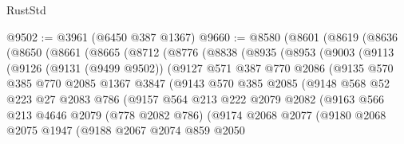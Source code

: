 \begin{lexlean}{RustStd}
\begin{coremodule}
@9502 := @3961 (@6450 @387 @1367)
@9660 := @8580
    (@8601
      (@8619
        (@8636
          (@8650
            (@8661
              (@8665
                (@8712
                  (@8776
                    (@8838
                      (@8935
                        (@8953
                          (@9003
                            (@9113
                              (@9126
                                (@9131 (@9499 @9502))
                                (@9127
                                  @571
                                  @387
                                  @770
                                  @2086
                                  (@9135
                                    @570
                                    @385
                                    @770
                                    @2085
                                    @1367
                                    @3847
                                    (@9143
                                      @570
                                      @385
                                      @2085
                                      (@9148
                                        @568
                                        @52
                                        @223
                                        @27
                                        @2083
                                        @786
                                        (@9157
                                          @564
                                          @213
                                          @222
                                          @2079
                                          @2082
                                          (@9163
                                            @566
                                            @213
                                            @4646
                                            @2079
                                            (@778 @2082 @786)
                                            (@9174
                                              @2068
                                              @2077
                                              (@9180
                                                @2068
                                                @2075
                                                @1947
                                                (@9188
                                                  @2067
                                                  @2074
                                                  @859
                                                  @2050

\end{coremodule}
\end{lexlean}
